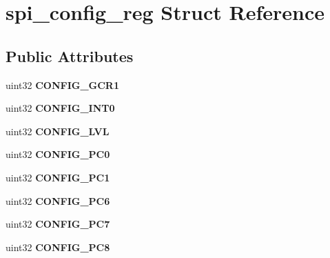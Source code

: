 \hypertarget{structspi__config__reg}{}\section{spi\+\_\+config\+\_\+reg Struct Reference}
\label{structspi__config__reg}
\subsection*{Public Attributes}
\begin{DoxyCompactItemize}
\item 
\mbox{\label{structspi__config__reg_ad4a93615c21b6fb6bb47ddbbc6400e43}} 
uint32 {\bfseries C\+O\+N\+F\+I\+G\+\_\+\+G\+C\+R1}
\item 
\mbox{\label{structspi__config__reg_a782eb372a86ca31e8224d085a2860706}} 
uint32 {\bfseries C\+O\+N\+F\+I\+G\+\_\+\+I\+N\+T0}
\item 
\mbox{\label{structspi__config__reg_a242d8c6cb9fcedba59901322e357c8af}} 
uint32 {\bfseries C\+O\+N\+F\+I\+G\+\_\+\+L\+VL}
\item 
\mbox{\label{structspi__config__reg_a7c6eaf4d0c48f229685091d131de83c6}} 
uint32 {\bfseries C\+O\+N\+F\+I\+G\+\_\+\+P\+C0}
\item 
\mbox{\label{structspi__config__reg_a91cfe5b9e8ed1faec9548f6198dd1a17}} 
uint32 {\bfseries C\+O\+N\+F\+I\+G\+\_\+\+P\+C1}
\item 
\mbox{\label{structspi__config__reg_a7c84a56defcc3b46b7649fcd386012d5}} 
uint32 {\bfseries C\+O\+N\+F\+I\+G\+\_\+\+P\+C6}
\item 
\mbox{\label{structspi__config__reg_a328c00672cc29310a6d83f3f384ce73d}} 
uint32 {\bfseries C\+O\+N\+F\+I\+G\+\_\+\+P\+C7}
\item 
\mbox{\label{structspi__config__reg_a1cb9b2563effc788129fffff5af7d655}} 
uint32 {\bfseries C\+O\+N\+F\+I\+G\+\_\+\+P\+C8}
\item 
\mbox{\label{structspi__config__reg_a71713fa473726ec5e99383ddfcce1965}} 

\end{DoxyCompactItemize}
